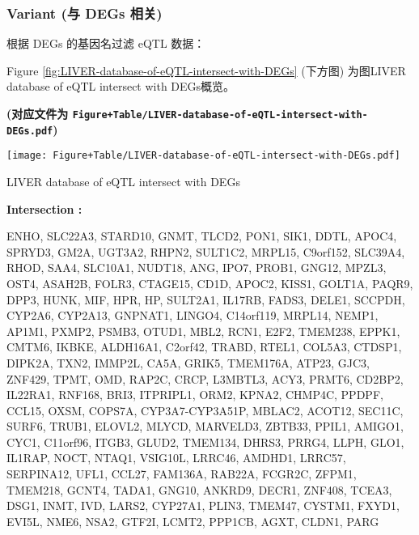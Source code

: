 \documentclass[
]{article}
\begin{document}
\hypertarget{variant-ux4e0e-degs-ux76f8ux5173}{%
\subsubsection{Variant (与 DEGs 相关)}\label{variant-ux4e0e-degs-ux76f8ux5173}}

根据 DEGs 的基因名过滤 eQTL 数据：

Figure \ref{fig:LIVER-database-of-eQTL-intersect-with-DEGs} (下方图) 为图LIVER database of eQTL intersect with DEGs概览。

\textbf{(对应文件为 \texttt{Figure+Table/LIVER-database-of-eQTL-intersect-with-DEGs.pdf})}

\def\@captype{figure}
\begin{center}
\texttt{[image: Figure+Table/LIVER-database-of-eQTL-intersect-with-DEGs.pdf]}
\caption{LIVER database of eQTL intersect with DEGs}\label{fig:LIVER-database-of-eQTL-intersect-with-DEGs}
\end{center}
\begin{center}\begin{tcolorbox}[colback=gray!10, colframe=gray!50, width=0.9\linewidth, arc=1mm, boxrule=0.5pt]
\textbf{
Intersection
:}

\vspace{0.5em}

    ENHO, SLC22A3, STARD10, GNMT, TLCD2, PON1, SIK1, DDTL,
APOC4, SPRYD3, GM2A, UGT3A2, RHPN2, SULT1C2, MRPL15,
C9orf152, SLC39A4, RHOD, SAA4, SLC10A1, NUDT18, ANG, IPO7,
PROB1, GNG12, MPZL3, OST4, ASAH2B, FOLR3, CTAGE15, CD1D,
APOC2, KISS1, GOLT1A, PAQR9, DPP3, HUNK, MIF, HPR, HP,
SULT2A1, IL17RB, FADS3, DELE1, SCCPDH, CYP2A6, CYP2A13,
GNPNAT1, LINGO4, C14orf119, MRPL14, NEMP1, AP1M1, PXMP2,
PSMB3, OTUD1, MBL2, RCN1, E2F2, TMEM238, EPPK1, CMTM6,
IKBKE, ALDH16A1, C2orf42, TRABD, RTEL1, COL5A3, CTDSP1,
DIPK2A, TXN2, IMMP2L, CA5A, GRIK5, TMEM176A, ATP23, GJC3,
ZNF429, TPMT, OMD, RAP2C, CRCP, L3MBTL3, ACY3, PRMT6,
CD2BP2, IL22RA1, RNF168, BRI3, ITPRIPL1, ORM2, KPNA2,
CHMP4C, PPDPF, CCL15, OXSM, COPS7A, CYP3A7-CYP3A51P,
MBLAC2, ACOT12, SEC11C, SURF6, TRUB1, ELOVL2, MLYCD,
MARVELD3, ZBTB33, PPIL1, AMIGO1, CYC1, C11orf96, ITGB3,
GLUD2, TMEM134, DHRS3, PRRG4, LLPH, GLO1, IL1RAP, NOCT,
NTAQ1, VSIG10L, LRRC46, AMDHD1, LRRC57, SERPINA12, UFL1,
CCL27, FAM136A, RAB22A, FCGR2C, ZFPM1, TMEM218, GCNT4,
TADA1, GNG10, ANKRD9, DECR1, ZNF408, TCEA3, DSG1, INMT,
IVD, LARS2, CYP27A1, PLIN3, TMEM47, CYSTM1, FXYD1, EVI5L,
NME6, NSA2, GTF2I, LCMT2, PPP1CB, AGXT, CLDN1, PARG

\vspace{2em}
\end{tcolorbox}
\end{center}
\end{document}
